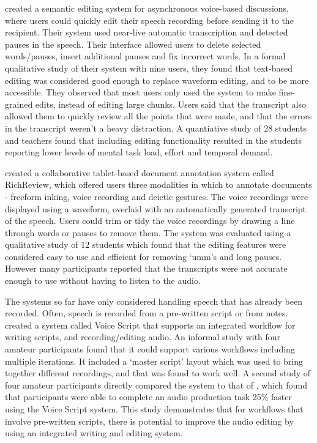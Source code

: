 \citet{Sivaraman2016} created a semantic editing system for asynchronous voice-based discussions, where users could
quickly edit their speech recording before sending it to the recipient.  Their system used near-live automatic
transcription and detected pauses in the speech. Their interface allowed users to delete selected words/pauses, insert
additional pauses and fix incorrect words.  In a formal qualitative study of their system with nine users, they found
that text-based editing was considered good enough to replace waveform editing, and to be more accessible. They
observed that most users only used the system to make fine-grained edits, instead of editing large chunks.  Users said
that the transcript also allowed them to quickly review all the points that were made, and that the errors in the
transcript weren't a heavy distraction. A quantiative study of 28 students and teachers found that
including editing functionality resulted in the students reporting lower levels of mental task load, effort and
temporal demand.

\citet{Yoon2014} created a collaborative tablet-based document annotation system called RichReview, which offered users
three modalities in which to annotate documents - freeform inking, voice recording and deictic gestures. The voice
recordings were displayed using a waveform, overlaid with an automatically generated transcript of the speech.
Users could trim or tidy the voice recordings by drawing a line through words or pauses to remove them.
The system was evaluated using a qualitative study of 12 students which found that the editing features were
considered easy to use and efficient for removing `umm's and long pauses.
However many participants reported that the transcripts were not accurate enough to use without having to listen to
the audio.

The systems so far have only considered handling speech that has already been recorded. Often, speech is recorded from
a pre-written script or from notes. \citet{Shin2016} created a system called Voice Script that supports an
integrated workflow for writing scripts, and recording/editing audio. An informal study with four amateur participants
found that it could support various workflows including multiple iterations. It included a `master script' layout
which was used to bring together different recordings,  and that was found to work well.  A second study of four
amateur participants directly compared the system to that of \citet{Rubin2013}, which found that participants were able
to complete an audio production task 25\% faster using the Voice Script system.  This study demonstrates that for
workflows that involve pre-written scripts, there is potential to improve the audio editing by using an integrated
writing and editing system.

